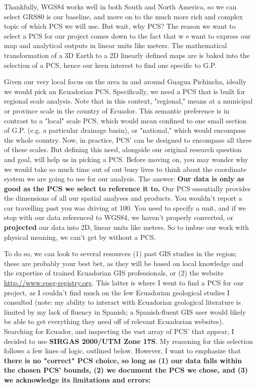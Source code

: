 \documentclass{article}
\begin{document}
Thankfully, WGS84 works well in both South and North America, so we can select GRS80 is our baseline, and move on to the much more rich and complex topic of which PCS we will use. But wait, why PCS? The reason we want to select a PCS for our project comes down to the fact that w e want to express our map and analytical outputs in linear units like meters. The mathematical transformation of a 3D Earth to a 2D linearly defined maps are is baked into the selection of a PCS, hence our keen interest to find one specific to G.P.

Given our very local focus on the area in and around Guagua Pichincha, ideally we would pick an Ecuadorian PCS. Specifically, we need a PCS that is built for regional scale analysis. Note that in this context, "regional," means at a municipal or province scale in the country of Ecuador. This semantic preference is in contrast to a "local" scale PCS, which would mean confined to one small section of G.P. (e.g. a particular drainage basin), or "national," which would encompass the whole country. Now, in practice, PCS' can be designed to encompass all three of these scales.  But defining this need, alongside our original research question and goal, will help us in picking a PCS. Before moving on, you may wonder why we would take so much time out of out busy lives to think about the coordinate system we are going to use for our analysis. The answer: \textbf{Our data is only as good as the PCS we select to reference it to.} Our PCS essentially provides the dimensions of all our spatial analyses and products. You wouldn't report a car travelling past you was driving at 100. You need to specify a unit, and if we stop with our data referenced to WGS84, we haven't properly converted, or \textbf{projected} our data into 2D, linear units like meters. So to imbue our work with physical meaning, we can't get by without a PCS.

To do so, we can look to several resources (1) past GIS studies in the region; these are probably your best bet, as they will be based on local knowledge and the expertise of trained Ecuadorian GIS professionals, or (2) the website \url{http://www.epsg-registry.org}. This latter is where I went to find a PCS for our project, as I couldn't find much on the few Ecuadorian geological studies I consulted (note: my ability to interact with Ecuadorian geological literature is limited by my lack of fluency in Spanish; a Spanish-fluent GIS user would likely be able to get everything they need off of relevant Ecuadorian websites). Searching for Ecuador, and inspecting the vast array of PCS' that appear, I decided to use \textbf{SIRGAS 2000/UTM Zone 17S}. My reasoning for this selection follows a few lines of logic. outlined below. However, I want to emphasize that \textbf{there is no "correct" PCS choice, so long as (1) our data falls within the chosen PCS' bounds, (2) we document the PCS we chose, and (3) we acknowledge its limitations and errors:}
\end{document}
